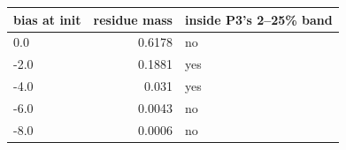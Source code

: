 \begin{tabular}{lrl}
\toprule
bias at init & residue mass & inside P3's 2--25\% band \\
\midrule
0.0 & 0.6178 & no \\
-2.0 & 0.1881 & yes \\
-4.0 & 0.031 & yes \\
-6.0 & 0.0043 & no \\
-8.0 & 0.0006 & no \\
\bottomrule
\end{tabular}